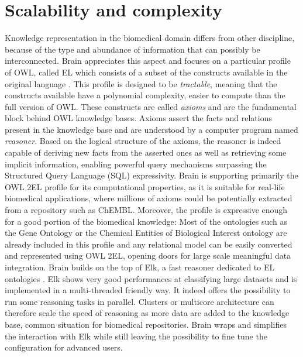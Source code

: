 \documentclass{bioinfo}
\begin{document}
\section{Scalability and complexity}
Knowledge representation in the biomedical domain differs from other discipline, because of the type and abundance of
information that can possibly be interconnected. Brain appreciates this aspect and focuses on a particular profile of OWL, called EL
which consists of a subset of the constructs available in the original language \citep{Motik2009}. This profile is
designed to be \emph{tractable}, meaning that the constructs available have a polynomial complexity, easier to compute than the full 
version of OWL. 
These constructs are called \emph{axioms} and are the fundamental block behind OWL knowledge bases.
Axioms assert the facts and relations present in the knowledge base and are understood by a computer program named \emph{reasoner}. 
Based on the logical structure of the axioms, the reasoner is indeed capable of deriving new facts from the asserted ones as well as retrieving
some implicit information, enabling powerful query mechanisms surpassing the Structured Query Language (SQL) expressivity. 
Brain is supporting primarily the OWL 2EL profile for its computational properties, as it is suitable for real-life biomedical applications, 
where millions of axioms could be potentially extracted from a repository such as ChEMBL.
Moreover, the profile is expressive enough for a good portion of the biomedical knowledge: Most of the ontologies such as the Gene Ontology or 
the Chemical Entities of Biological Interest ontology are already included in this profile and any relational model can be easily 
converted and represented using OWL 2EL, opening doors for large scale meaningful data integration.
Brain builds on the top of Elk, a fast reasoner dedicated to EL ontologies \citep{YevgenyKazakov2011}. Elk shows very good 
performances at classifying 
large datasets and is implemented in a multi-threaded friendly way. It indeed offers the possibility to run some reasoning tasks in parallel.
Clusters or multicore architecture can therefore scale the speed of reasoning as more data are added to the knowledge base, common
situation for biomedical repositories. Brain wraps and simplifies the interaction with Elk while still leaving the possibility to fine tune 
the configuration for advanced users.
\end{document}
